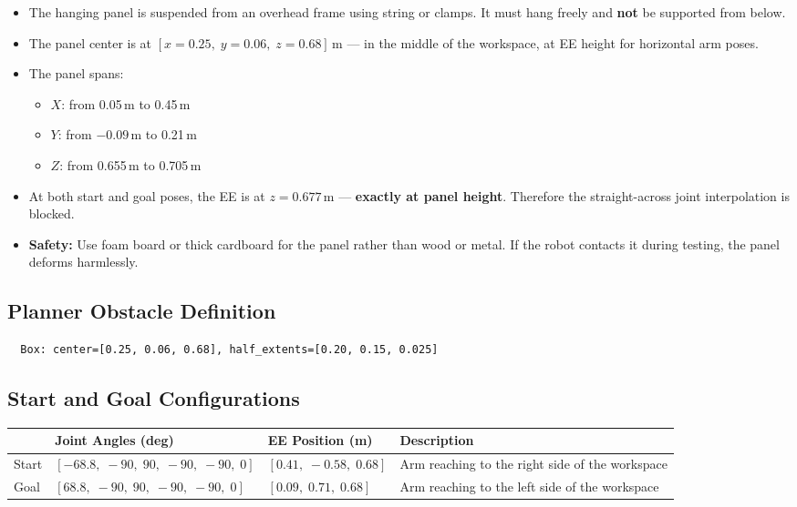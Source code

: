 \documentclass[11pt]{article}
\begin{document}
\begin{itemize}[itemsep=2pt]
  \item The hanging panel is suspended from an overhead frame using string or clamps. It must hang freely and \textbf{not} be supported from below.
  \item The panel center is at $[x = 0.25,\; y = 0.06,\; z = 0.68]$\,m --- in the middle of the workspace, at EE height for horizontal arm poses.
  \item The panel spans:
  \begin{itemize}
    \item $X$: from 0.05\,m to 0.45\,m
    \item $Y$: from $-0.09$\,m to 0.21\,m
    \item $Z$: from 0.655\,m to 0.705\,m
  \end{itemize}
  \item At both start and goal poses, the EE is at $z = 0.677$\,m --- \textbf{exactly at panel height}. Therefore the straight-across joint interpolation is blocked.
  \item \textbf{Safety:} Use foam board or thick cardboard for the panel rather than wood or metal. If the robot contacts it during testing, the panel deforms harmlessly.
\end{itemize}

\subsection{Planner Obstacle Definition}

\begin{verbatim}
  Box: center=[0.25, 0.06, 0.68], half_extents=[0.20, 0.15, 0.025]
\end{verbatim}

\subsection{Start and Goal Configurations}

\begin{table}[h]
\centering
\begin{tabular}{@{}lllp{5.5cm}@{}}
\toprule
 & Joint Angles (deg) & EE Position (m) & Description \\
\midrule
Start & $[-68.8,\; -90,\; 90,\; -90,\; -90,\; 0]$
      & $[0.41,\; -0.58,\; 0.68]$
      & Arm reaching to the right side of the workspace \\[4pt]
Goal  & $[68.8,\; -90,\; 90,\; -90,\; -90,\; 0]$
      & $[0.09,\; 0.71,\; 0.68]$
      & Arm reaching to the left side of the workspace \\
\bottomrule
\end{tabular}
\end{table}
\end{document}
